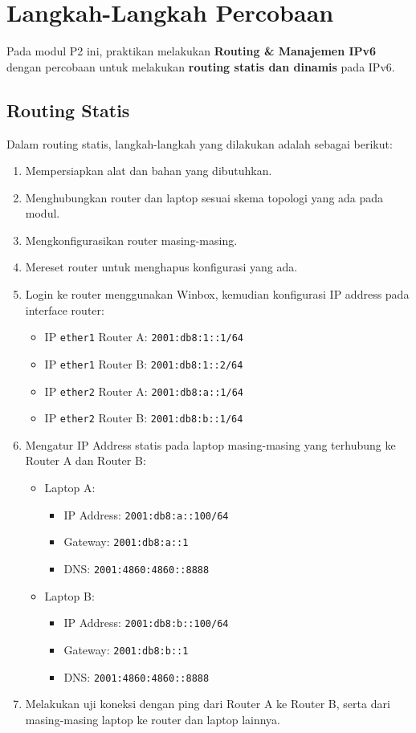 \section{Langkah-Langkah Percobaan}
Pada modul P2 ini, praktikan melakukan \textbf{Routing \& Manajemen IPv6} dengan percobaan untuk melakukan \textbf{routing statis dan dinamis} pada IPv6.

\subsection{Routing Statis}
Dalam routing statis, langkah-langkah yang dilakukan adalah sebagai berikut:
\begin{enumerate}
    \item Mempersiapkan alat dan bahan yang dibutuhkan.
    \item Menghubungkan router dan laptop sesuai skema topologi yang ada pada modul.
    \item Mengkonfigurasikan router masing-masing.
    \item Mereset router untuk menghapus konfigurasi yang ada.
    \item Login ke router menggunakan Winbox, kemudian konfigurasi IP address pada interface router:
    \begin{itemize}
        \item IP \texttt{ether1} Router A: \texttt{2001:db8:1::1/64}
        \item IP \texttt{ether1} Router B: \texttt{2001:db8:1::2/64}
        \item IP \texttt{ether2} Router A: \texttt{2001:db8:a::1/64}
        \item IP \texttt{ether2} Router B: \texttt{2001:db8:b::1/64}
    \end{itemize}
    \item Mengatur IP Address statis pada laptop masing-masing yang terhubung ke Router A dan Router B:
    \begin{itemize}
        \item Laptop A:
        \begin{itemize}
            \item IP Address: \texttt{2001:db8:a::100/64}
            \item Gateway: \texttt{2001:db8:a::1}
            \item DNS: \texttt{2001:4860:4860::8888}
        \end{itemize}
        \item Laptop B:
        \begin{itemize}
            \item IP Address: \texttt{2001:db8:b::100/64}
            \item Gateway: \texttt{2001:db8:b::1}
            \item DNS: \texttt{2001:4860:4860::8888}
        \end{itemize}
    \end{itemize}
    \item Melakukan uji koneksi dengan ping dari Router A ke Router B, serta dari masing-masing laptop ke router dan laptop lainnya.
\end{enumerate}

